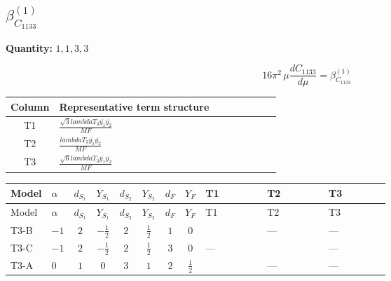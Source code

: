 \documentclass[8pt]{article}
\begin{document}
\begin{landscape}
\section*{$\beta_{C_{1133}}^{(1)}$}
\noindent\textbf{Quantity: }$\mathrm{1,1,3,3}$\par\smallskip
\[16\pi^2\,\mu\frac{d C_{1133}}{d\mu}=\beta_{C_{1133}}^{(1)}\]
\begin{center}
\begin{tabular}{@{}c >{\raggedright\arraybackslash}p{0.82\linewidth}@{}}
\toprule
Column & Representative term structure \\
\midrule
T1 & \(\displaystyle \frac{\sqrt{3} lambdaT_{3} \overline{y_{1}} \overline{y_{2}}}{MF}\) \\
\midrule
T2 & \(\displaystyle \frac{lambdaT_{3} \overline{y_{1}} \overline{y_{2}}}{MF}\) \\
\midrule
T3 & \(\displaystyle \frac{\sqrt{6} lambdaT_{3} \overline{y_{1}} \overline{y_{2}}}{MF}\) \\
\midrule
\bottomrule
\end{tabular}
\end{center}
\smallskip
\tiny
\begin{longtable}{@{}llcccccc >{\raggedright\arraybackslash}p{0.21\linewidth} >{\raggedright\arraybackslash}p{0.21\linewidth} >{\raggedright\arraybackslash}p{0.21\linewidth}@{}}
\toprule
Model & $\alpha$ & $d_{S_1}$ & $Y_{S_1}$ & $d_{S_2}$ & $Y_{S_2}$ & $d_F$ & $Y_F$ & T1 & T2 & T3 \\
\midrule
\endfirsthead
\toprule
Model & $\alpha$ & $d_{S_1}$ & $Y_{S_1}$ & $d_{S_2}$ & $Y_{S_2}$ & $d_F$ & $Y_F$ & T1 & T2 & T3 \\
\midrule
\endhead
T3-B & $-1$ & $2$ & $-\frac{1}{2}$ & $2$ & $\frac{1}{2}$ & $1$ & $0$ & \scriptsize\adjustbox{max width=\linewidth}{$\begin{gathered} \frac{2 \sqrt{3} lambdaT_{3} \overline{y_{1}} \overline{y_{2}}}{3 MF}\end{gathered}$} & --- & --- \\
\midrule
T3-C & $-1$ & $2$ & $-\frac{1}{2}$ & $2$ & $\frac{1}{2}$ & $3$ & $0$ & --- & \scriptsize\adjustbox{max width=\linewidth}{$\begin{gathered} - \frac{2 lambdaT_{3} \overline{y_{1}} \overline{y_{2}}}{3 MF}\end{gathered}$} & --- \\
\midrule
T3-A & $0$ & $1$ & $0$ & $3$ & $1$ & $2$ & $\frac{1}{2}$ & \scriptsize\adjustbox{max width=\linewidth}{$\begin{gathered} \frac{2 \sqrt{3} lambdaT_{3} \overline{y_{1}} \overline{y_{2}}}{3 MF}\end{gathered}$} & --- & --- \\

\end{longtable}
\end{landscape}
\end{document}

